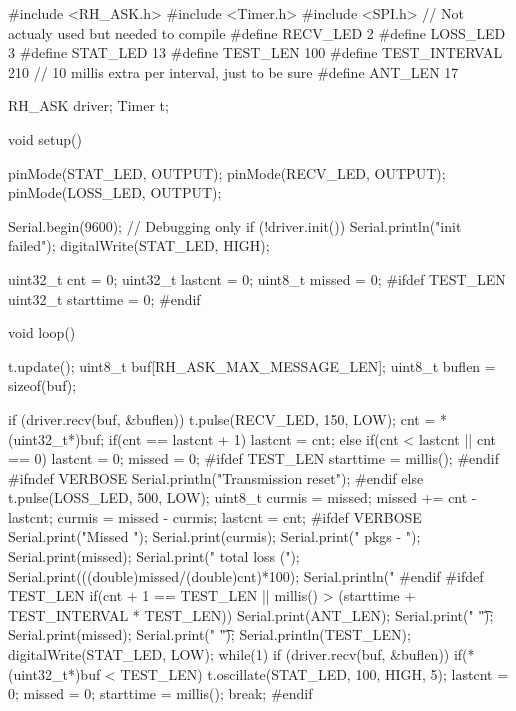 #include <RH_ASK.h>
#include <Timer.h>
#include <SPI.h> // Not actualy used but needed to compile
#define RECV_LED 2
#define LOSS_LED 3
#define STAT_LED 13
#define TEST_LEN 100
#define TEST_INTERVAL 210 // 10 millis extra per interval, just to be sure
#define ANT_LEN 17

RH_ASK driver;
Timer t;

void setup() {
    pinMode(STAT_LED, OUTPUT);
    pinMode(RECV_LED, OUTPUT);
    pinMode(LOSS_LED, OUTPUT);
    
    Serial.begin(9600);	// Debugging only
    if (!driver.init())
         Serial.println("init failed");
    digitalWrite(STAT_LED, HIGH);
}

uint32_t cnt = 0;
uint32_t lastcnt = 0;
uint8_t missed = 0;
#ifdef TEST_LEN
uint32_t starttime = 0;
#endif

void loop() {
    t.update();
    uint8_t buf[RH_ASK_MAX_MESSAGE_LEN];
    uint8_t buflen = sizeof(buf);

    if (driver.recv(buf, &buflen)) {
      t.pulse(RECV_LED, 150, LOW);
      cnt =  *(uint32_t*)buf;
      if(cnt == lastcnt + 1) {
        lastcnt = cnt;
      } else if(cnt < lastcnt || cnt == 0) {
        lastcnt = 0;
        missed = 0;
        #ifdef TEST_LEN
        starttime = millis();
        #endif
        #ifndef VERBOSE
        Serial.println("Transmission reset");
        #endif
      } else {
        t.pulse(LOSS_LED, 500, LOW);
        uint8_t curmis = missed;
        missed += cnt - lastcnt;
        curmis = missed - curmis;
        lastcnt = cnt;
        #ifdef VERBOSE
        Serial.print("Missed ");
        Serial.print(curmis);
        Serial.print(" pkgs - ");
        Serial.print(missed);
        Serial.print(" total loss (");
        Serial.print(((double)missed/(double)cnt)*100);
        Serial.println(" %
        #endif
      }
      #ifdef TEST_LEN
      if(cnt + 1 == TEST_LEN || millis() > (starttime + TEST_INTERVAL * TEST_LEN)){
        Serial.print(ANT_LEN);
        Serial.print(" \t ");
        Serial.print(missed);
        Serial.print(" \t ");
        Serial.println(TEST_LEN);
        digitalWrite(STAT_LED, LOW);
        while(1){
          if (driver.recv(buf, &buflen))
            if(*(uint32_t*)buf < TEST_LEN){
              t.oscillate(STAT_LED, 100, HIGH, 5);
              lastcnt = 0;
              missed = 0;
              starttime = millis();
              break; 
            }
        }
      }
      #endif     
    }
}